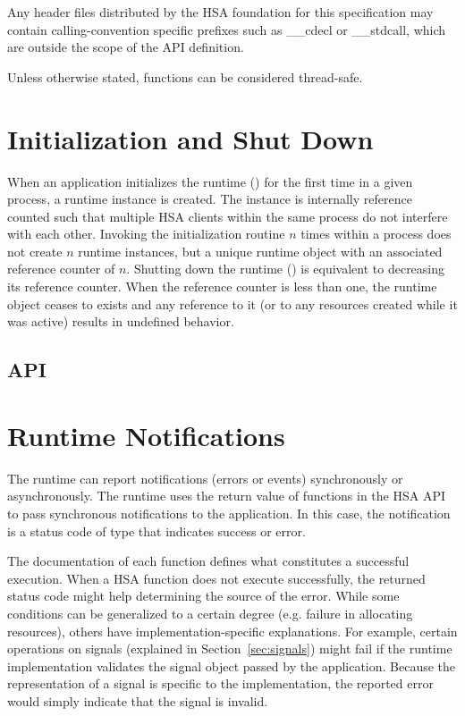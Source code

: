 \documentclass[final]{book}
\begin{document}
Any header files distributed by the HSA foundation for this specification may
contain calling-convention specific prefixes such as __cdecl or __stdcall, which
are outside the scope of the API definition.

Unless otherwise stated, functions can be considered thread-safe.

\section{Initialization and Shut Down}\label{sec:init}
When an application initializes the runtime () for the first time
in a given process, a runtime instance is created. The instance is internally
reference counted such that multiple HSA clients within the same process do not
interfere with each other. Invoking the initialization routine $n$ times within
a process does not create $n$ runtime instances, but a unique runtime object
with an associated reference counter of $n$. Shutting down the runtime
() is equivalent to decreasing its reference counter. When
the reference counter is less than one, the runtime object ceases to exists and
any reference to it (or to any resources created while it was active) results in
undefined behavior.

\subsection{API}


\section{Runtime Notifications}
\label{sec:error}

The runtime can report notifications (errors or events) synchronously or
asynchronously. The runtime uses the return value of functions in the HSA API to
pass synchronous notifications to the application. In this case, the
notification is a status code of type  that indicates
success or error.

The documentation of each function defines what constitutes a successful
execution. When a HSA function does not execute successfully, the returned
status code might help determining the source of the error. While some
conditions can be generalized to a certain degree (e.g. failure in allocating
resources), others have implementation-specific explanations. For
example, certain operations on signals (explained in Section~\ref{sec:signals})
might fail if the runtime implementation validates the signal object passed by
the application. Because the representation of a signal is specific to the
implementation, the reported error would simply indicate that the signal is
invalid.
\end{document}
